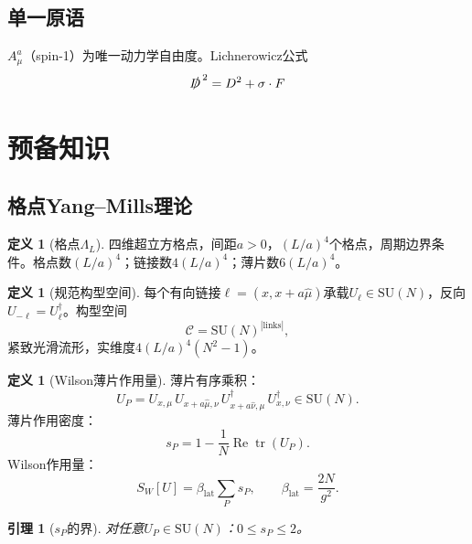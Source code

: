 \documentclass[12pt,a4paper]{article}
\theoremstyle{plain}
\newtheorem{lemma}[theorem]{引理}
\theoremstyle{definition}
\newtheorem{definition}[theorem]{定义}
\theoremstyle{remark}
\begin{document}
\subsection{单一原语}\label{sec:primitive}
$A_\mu^a$（spin-1）为唯一动力学自由度。Lichnerowicz公式
\begin{equation}\label{eq:Lich}
\slashed{D}^{\,2}=D^2+\sigma\cdot F
\end{equation}
\section{预备知识}\label{sec:prelim}

\subsection{格点Yang--Mills理论}\label{sec:lattice}

\begin{definition}[格点$\Lambda_L$]\label{def:lattice}
四维超立方格点，间距$a>0$，$(L/a)^4$个格点，周期边界条件。格点数$(L/a)^4$；链接数$4(L/a)^4$；薄片数$6(L/a)^4$。
\end{definition}

\begin{definition}[规范构型空间]\label{def:config}
每个有向链接$\ell=(x,x+a\hat\mu)$承载$U_\ell\in\mathrm{SU}(N)$，反向$U_{-\ell}=U_\ell^\dagger$。构型空间
\begin{equation}\label{eq:config}
\mathcal{C} = \mathrm{SU}(N)^{|\mathrm{links}|},
\end{equation}
紧致光滑流形，实维度$4(L/a)^4(N^2-1)$。
\end{definition}

\begin{definition}[Wilson薄片作用量]\label{def:wilson}
薄片有序乘积：
\begin{equation}\label{eq:UP}
U_P = U_{x,\mu}\,U_{x+a\hat\mu,\nu}\,U_{x+a\hat\nu,\mu}^\dagger\,U_{x,\nu}^\dagger \in \mathrm{SU}(N).
\end{equation}
薄片作用密度：
\begin{equation}\label{eq:sp}
s_P = 1 - \frac{1}{N}\operatorname{Re}\operatorname{tr}(U_P).
\end{equation}
Wilson作用量：
\begin{equation}\label{eq:SW}
S_W[U] = \beta_{\mathrm{lat}}\sum_P s_P, \qquad \beta_{\mathrm{lat}} = \frac{2N}{g^2}.
\end{equation}
\end{definition}

\begin{lemma}[$s_P$的界]\label{lem:sp}
对任意$U_P\in\mathrm{SU}(N)$：$0\leq s_P\leq 2$。
\end{lemma}
\end{document}
